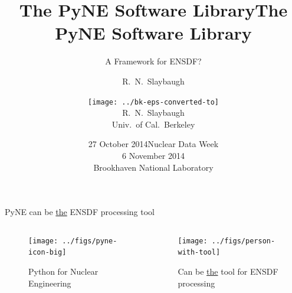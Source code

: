 \documentclass[xcolor=x11names,compress]{beamer}
\title{The PyNE Software Library}
\author{R.\ N.\ Slaybaugh}
\date{27 October 2014}
\renewcommand{\(}{\begin{columns}}
\renewcommand{\)}{\end{columns}}
\newcommand{\<}[1]{\begin{column}{#1}}
\renewcommand{\>}{\end{column}}
\begin{document}
\begin{frame}
\title{The PyNE Software Library}
\subtitle{A Framework for ENSDF?}
\author{
\texttt{[image: ../bk-eps-converted-to]}\\R.\ N.\ Slaybaugh \\ Univ.\ of Cal.\ Berkeley}

\date{Nuclear Data Week\\ 6 November 2014\\ Brookhaven National Laboratory}
\titlepage
\end{frame}

\begin{frame}{PyNE can be \underline{the} ENSDF processing tool}

	\begin{columns}
  	\begin{column}{0.45\textwidth}
 	   \begin{center}
 	   \begin{figure}
       \texttt{[image: ../figs/pyne-icon-big]}
       \caption{Python for Nuclear Engineering}
	   \end{figure}
 	   \end{center}
  	\end{column}
 	\begin{column}{0.45\textwidth}
 	   \begin{center}
 	   \begin{figure}
       \texttt{[image: ../figs/person-with-tool]}
       \caption{Can be \underline{the} tool for ENSDF processing}
	   \end{figure}
 	   \end{center}
  	\end{column}
	\end{columns}

\end{frame}
\end{document}
